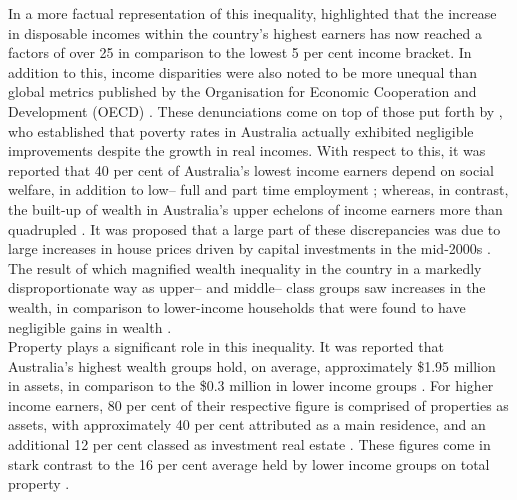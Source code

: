 In a more factual representation of this inequality, \cite{davidson2018inequality} highlighted that the increase in disposable incomes within the country's highest earners has now reached a factors of over 25 in comparison to the lowest 5 per cent income bracket. In addition to this, income disparities were also noted to be more unequal than global metrics published by the Organisation for Economic Cooperation and Development (OECD) \citep{davidson2018inequality}. These denunciations come on top of those put forth by \cite{gittins_2018}, who established that poverty rates in Australia actually exhibited negligible improvements despite the growth in real incomes. With respect to this, it was reported that 40 per cent of Australia's lowest income earners depend on social welfare, in addition to low-- full and part time employment \citep{davidson2018inequality}; whereas, in contrast, the built-up of wealth in Australia's upper echelons of income earners more than quadrupled  \citep{davidson1995accessibility}. It was proposed that a large part of these discrepancies was due to large increases in house prices driven by capital investments in the mid-2000s \citep{davidson2018inequality,wiesel_2020}. The result of which magnified wealth inequality in the country in a markedly disproportionate way as upper-- and middle-- class groups saw increases in the wealth, in comparison to lower-income households that were found to have negligible gains in wealth \citep{gittins_2018}.\\ 

Property plays a significant role in this inequality. It was reported that Australia's highest wealth groups hold, on average, approximately \$1.95 million in assets, in comparison to the \$0.3 million in lower income groups  \citep{davidson2018inequality}. For higher income earners, 80 per cent of their respective figure is comprised of properties as assets, with approximately 40 per cent attributed as a main residence, and an additional 12 per cent classed as investment real estate \citep{davidson1995accessibility,wiesel_2020}. These figures come in stark contrast to the 16 per cent average held by lower income groups on total property \citep{davidson2018inequality}. \\

